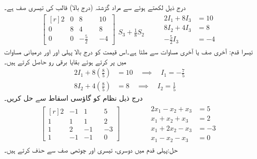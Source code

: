 درج ذیل لکھتے ہوئے  سے مراد گزشتہ (درج بالا) قالب کی تیسری صف  ہے۔
\begin{gather*}
\begin{bmatrix*}[r]2&0&8&&10\\0&8&4&&8\\
0&0&-\frac{5}{2}&&-4  \end{bmatrix*}\begin{matrix} \\ \\ S_3+\frac{1}{8}S_2 \end{matrix} \quad \quad 
\begin{aligned}
2I_1+8I_3&=10\\
8I_2+4I_3&=8\\
-\frac{5}{2}I_3&=-4
\end{aligned}
\end{gather*}
تیسرا قدم: آخری صف یا آخری مساوات سے  ملتا ہے۔اس قیمت کو درج بالا پہلی اور  اور درمیانی مساوات  میں پر کرتے ہوئے بقایا برقی رو حاصل کرتے ہیں۔
\begin{align*}
2I_1+8\left(\frac{8}{5}\right)&=10\quad \implies \quad I_1=-\frac{7}{5}\\
8I_2+4\left(\frac{8}{5}\right)&=8\quad \implies \quad I_2=\frac{1}{5}
\end{align*}
درج ذیل نظام کو گاؤسی اسقاط سے حل کریں۔
\begin{gather*}
\begin{bmatrix*}[r]
2&-1&1&&5\\
1&1&1&&2\\
1&2&-1&&-3\\
1&-1&-1&&0
\end{bmatrix*}\quad\quad\quad \quad
\begin{aligned}
2x_1-x_2+x_3&=5\\
x_1+x_2+x_3&=2\\
x_1+2x_2-x_3&=-3\\
x_1-x_2-x_3&=0
\end{aligned}
\end{gather*}
حل:پہلی قدم میں دوسری، تیسری اور چوتھی صف سے  حذف کرتے ہیں۔
